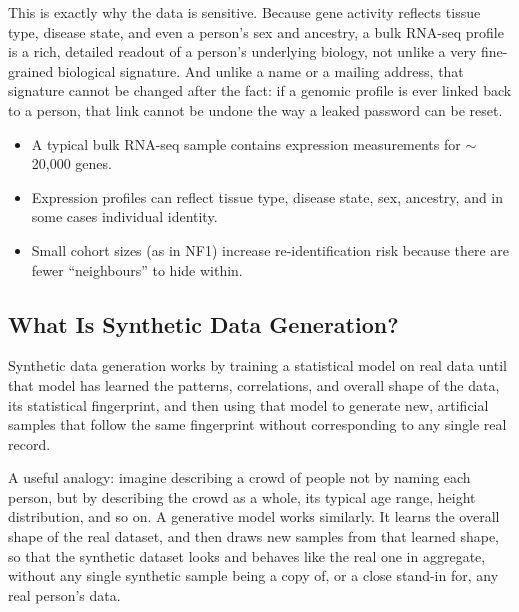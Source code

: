 \documentclass[webpdf,contemporary,large]{oup-authoring-template}%
\theoremstyle{thmstyleone}%
\theoremstyle{thmstyletwo}%
\theoremstyle{thmstylethree}%
\begin{document}
This is exactly why the data is sensitive. Because gene activity reflects tissue type, disease state, and even a person's sex and ancestry, a bulk RNA-seq profile is a rich, detailed readout of a person's underlying biology, not unlike a very fine-grained biological signature. And unlike a name or a mailing address, that signature cannot be changed after the fact: if a genomic profile is ever linked back to a person, that link cannot be undone the way a leaked password can be reset.

\begin{technicalbox}[title={RNA-seq data characteristics relevant to privacy}]
  \begin{itemize}
    \item A typical bulk RNA-seq sample contains expression measurements
          for $\sim$20,000 genes.
    \item Expression profiles can reflect tissue type, disease state, sex,
          ancestry, and in some cases individual identity.
    \item Small cohort sizes (as in NF1) increase re-identification risk
          because there are fewer ``neighbours'' to hide within.
  \end{itemize}
\end{technicalbox}

\subsection{What Is Synthetic Data Generation?}

Synthetic data generation works by training a statistical model on real data until that model has learned the patterns, correlations, and overall shape of the data, its statistical fingerprint, and then using that model to generate new, artificial samples that follow the same fingerprint without corresponding to any single real record.

A useful analogy: imagine describing a crowd of people not by naming each person, but by describing the crowd as a whole, its typical age range, height distribution, and so on. A generative model works similarly. It learns the overall shape of the real dataset, and then draws new samples from that learned shape, so that the synthetic dataset looks and behaves like the real one in aggregate, without any single synthetic sample being a copy of, or a close stand-in for, any real person's data.
\end{document}
